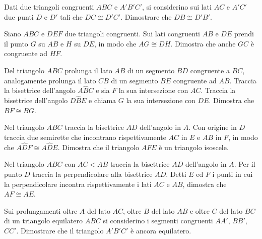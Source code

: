 \begin{multicols}{2}
\begin{esercizio}
\label{ese:2.12}
Dati due triangoli congruenti \(ABC\) e \(A'B'C'\), si considerino sui 
lati \(AC\) e \(A'C'\) due punti \(D\) e \(D'\) tali che \(DC\cong D'C'\).  
Dimostrare che \(DB\cong D'B'\).
\end{esercizio}

\begin{esercizio}
\label{ese:2.13}
Siano \(ABC\) e \(DEF\) due triangoli congruenti. Sui lati congruenti 
\(AB\) e \(DE\) prendi il punto \(G\) su \(AB\) e \(H\) su \(DE\), in modo che 
\(AG\cong DH\). Dimostra che anche \(GC\) è congruente ad \(HF\).
\end{esercizio}

\begin{esercizio}
\label{ese:2.14}
Del triangolo \(ABC\) prolunga il lato \(AB\) di un segmento \(BD\) 
congruente a \(BC\), analogamente prolunga il lato \(CB\) di un segmento 
\(BE\) congruente ad \(AB\). Traccia la bisettrice dell'angolo 
\(A\widehat{B}C\) e sia \(F\) la sua intersezione con \(AC\). Traccia la 
bisettrice dell'angolo \(D\widehat{B}E\) e chiama \(G\) la sua 
intersezione con \(DE\). Dimostra che \(BF\cong BG\).
\end{esercizio}

\begin{esercizio}
\label{ese:2.15}
Nel triangolo \(ABC\) traccia la bisettrice \(AD\) dell'angolo in \(A\). 
Con origine in \(D\) traccia due semirette che incontrano 
rispettivamente \(AC\) in \(E\) e \(AB\) in \(F\), in modo che 
\(A\widehat{D}F\cong A\widehat{D}E\). Dimostra che il triangolo \(AFE\) è 
un triangolo isoscele.
\end{esercizio}

\begin{esercizio}
\label{ese:2.16}
Nel triangolo \(ABC\) con \(AC<AB\) traccia la bisettrice \(AD\) 
dell'angolo in \(A\). Per il punto \(D\) traccia la perpendicolare alla 
bisettrice \(AD\). Detti \(E\) ed \(F\) i punti in cui la perpendicolare 
incontra rispettivamente i lati \(AC\) e \(AB\), dimostra che \(AF\cong 
AE\).
\end{esercizio}

\begin{esercizio}
\label{ese:2.17}
Sui prolungamenti oltre \(A\) del lato \(AC\), oltre \(B\) del lato \(AB\) e 
oltre \(C\) del lato \(BC\) di un triangolo equilatero \(ABC\) si 
considerino i segmenti congruenti \(AA'\), \(BB'\), \(CC'\). Dimostrare che 
il triangolo \(A'B'C'\) è ancora equilatero.
\end{esercizio}


\end{multicols}
